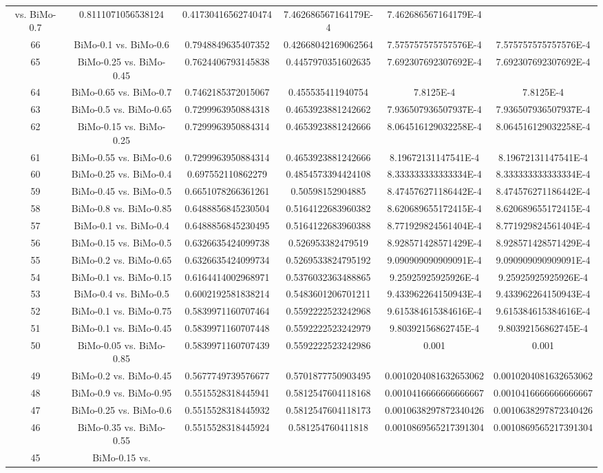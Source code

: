 \documentclass[a4paper,10pt]{article}
\begin{document}
\begin{landscape}
\begin{table}[!htp]
\begin{tabular}{cccccc}
vs. BiMo-0.7&0.8111071056538124&0.41730416562740474&7.462686567164179E-4&7.462686567164179E-4\\66&BiMo-0.1 vs. BiMo-0.6&0.7948849635407352&0.42668042169062564&7.575757575757576E-4&7.575757575757576E-4\\65&BiMo-0.25 vs. BiMo-0.45&0.7624406793145838&0.4457970351602635&7.692307692307692E-4&7.692307692307692E-4\\64&BiMo-0.65 vs. BiMo-0.7&0.7462185372015067&0.455535411940754&7.8125E-4&7.8125E-4\\63&BiMo-0.5 vs. BiMo-0.65&0.7299963950884318&0.4653923881242662&7.936507936507937E-4&7.936507936507937E-4\\62&BiMo-0.15 vs. BiMo-0.25&0.7299963950884314&0.4653923881242666&8.064516129032258E-4&8.064516129032258E-4\\61&BiMo-0.55 vs. BiMo-0.6&0.7299963950884314&0.4653923881242666&8.19672131147541E-4&8.19672131147541E-4\\60&BiMo-0.25 vs. BiMo-0.4&0.697552110862279&0.4854573394424108&8.333333333333334E-4&8.333333333333334E-4\\59&BiMo-0.45 vs. BiMo-0.5&0.6651078266361261&0.50598152904885&8.474576271186442E-4&8.474576271186442E-4\\58&BiMo-0.8 vs. BiMo-0.85&0.6488856845230504&0.5164122683960382&8.620689655172415E-4&8.620689655172415E-4\\57&BiMo-0.1 vs. BiMo-0.4&0.6488856845230495&0.5164122683960388&8.771929824561404E-4&8.771929824561404E-4\\56&BiMo-0.15 vs. BiMo-0.5&0.6326635424099738&0.526953382479519&8.928571428571429E-4&8.928571428571429E-4\\55&BiMo-0.2 vs. BiMo-0.65&0.6326635424099734&0.5269533824795192&9.090909090909091E-4&9.090909090909091E-4\\54&BiMo-0.1 vs. BiMo-0.15&0.6164414002968971&0.5376032363488865&9.25925925925926E-4&9.25925925925926E-4\\53&BiMo-0.4 vs. BiMo-0.5&0.6002192581838214&0.5483601206701211&9.433962264150943E-4&9.433962264150943E-4\\52&BiMo-0.1 vs. BiMo-0.75&0.5839971160707464&0.5592222523242968&9.615384615384616E-4&9.615384615384616E-4\\51&BiMo-0.1 vs. BiMo-0.45&0.5839971160707448&0.5592222523242979&9.80392156862745E-4&9.80392156862745E-4\\50&BiMo-0.05 vs. BiMo-0.85&0.5839971160707439&0.5592222523242986&0.001&0.001\\49&BiMo-0.2 vs. BiMo-0.45&0.5677749739576677&0.5701877750903495&0.0010204081632653062&0.0010204081632653062\\48&BiMo-0.9 vs. BiMo-0.95&0.5515528318445941&0.5812547604118168&0.0010416666666666667&0.0010416666666666667\\47&BiMo-0.25 vs. BiMo-0.6&0.5515528318445932&0.5812547604118173&0.0010638297872340426&0.0010638297872340426\\46&BiMo-0.35 vs. BiMo-0.55&0.5515528318445924&0.581254760411818&0.0010869565217391304&0.0010869565217391304\\45&BiMo-0.15 vs. 
\end{tabular}
\end{table}
\end{landscape}
\end{document}
